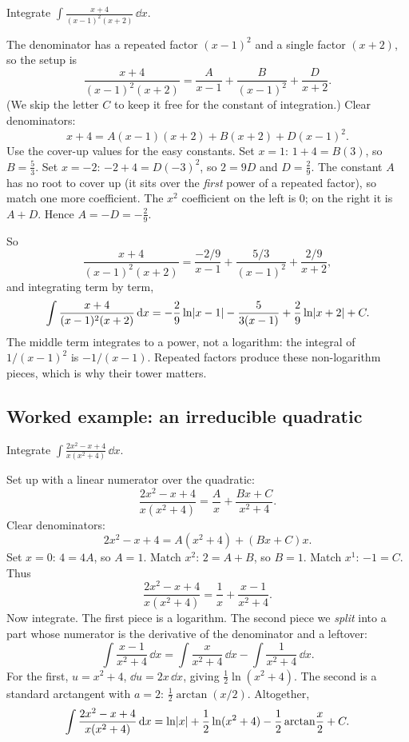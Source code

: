 \begin{example}
\label{ch24:ex-repeated}
Integrate $\displaystyle \int \frac{x + 4}{(x-1)^2(x+2)}\,\dd x.$
\end{example}

The denominator has a repeated factor $(x-1)^2$ and a single factor $(x+2)$,
so the setup is
\[
\frac{x+4}{(x-1)^2(x+2)} = \frac{A}{x-1} + \frac{B}{(x-1)^2} + \frac{D}{x+2}.
\]
(We skip the letter $C$ to keep it free for the constant of integration.)
Clear denominators:
\[
x + 4 = A(x-1)(x+2) + B(x+2) + D(x-1)^2.
\]
Use the cover-up values for the easy constants. Set $x = 1$: $1 + 4 = B(3)$, so
$B = \tfrac{5}{3}$. Set $x = -2$: $-2 + 4 = D(-3)^2$, so $2 = 9D$ and $D =
\tfrac{2}{9}$. The constant $A$ has no root to cover up (it sits over the
\emph{first} power of a repeated factor), so match one more coefficient. The
$x^2$ coefficient on the left is $0$; on the right it is $A + D$. Hence $A =
-D = -\tfrac{2}{9}$.

So
\[
\frac{x+4}{(x-1)^2(x+2)} = \frac{-2/9}{x-1} + \frac{5/3}{(x-1)^2}
+ \frac{2/9}{x+2},
\]
and integrating term by term,
\[
\int \frac{x+4}{(x-1)^2(x+2)}\,\mathrm{d} x
= -\frac{2}{9}\ln\lvert x-1\rvert - \frac{5}{3(x-1)} + \frac{2}{9}\ln\lvert x+2\rvert + C.
\]
The middle term integrates to a power, not a logarithm: the integral of
$1/(x-1)^2$ is $-1/(x-1)$. Repeated factors produce these non-logarithm
pieces, which is why their tower matters.

\subsection{Worked example: an irreducible quadratic}

\begin{example}
\label{ch24:ex-quadratic}
Integrate $\displaystyle \int \frac{2x^2 - x + 4}{x(x^2+4)}\,\dd x.$
\end{example}

Set up with a linear numerator over the quadratic:
\[
\frac{2x^2 - x + 4}{x(x^2+4)} = \frac{A}{x} + \frac{Bx + C}{x^2 + 4}.
\]
Clear denominators:
\[
2x^2 - x + 4 = A(x^2+4) + (Bx + C)x.
\]
Set $x = 0$:
$4 = 4A$, so $A = 1$. Match $x^2$: $2 = A + B$, so $B = 1$. Match $x^1$:
$-1 = C$. Thus
\[
\frac{2x^2-x+4}{x(x^2+4)} = \frac{1}{x} + \frac{x - 1}{x^2+4}.
\]
Now integrate. The first piece is a logarithm. The second piece we
\emph{split} into a part whose numerator is the derivative of the denominator
and a leftover:
\[
\int \frac{x - 1}{x^2 + 4}\,\dd x
= \int \frac{x}{x^2+4}\,\dd x - \int \frac{1}{x^2+4}\,\dd x.
\]
For the first, $u = x^2 + 4$, $\dd u = 2x\,\dd x$, giving
$\tfrac{1}{2}\ln(x^2+4)$. The second is a standard arctangent with $a = 2$:
$\tfrac{1}{2}\arctan(x/2)$. Altogether,
\[
\int \frac{2x^2-x+4}{x(x^2+4)}\,\mathrm{d} x
= \ln\lvert x\rvert + \frac{1}{2}\ln(x^2+4) - \frac{1}{2}\arctan\!\frac{x}{2} + C.
\]

